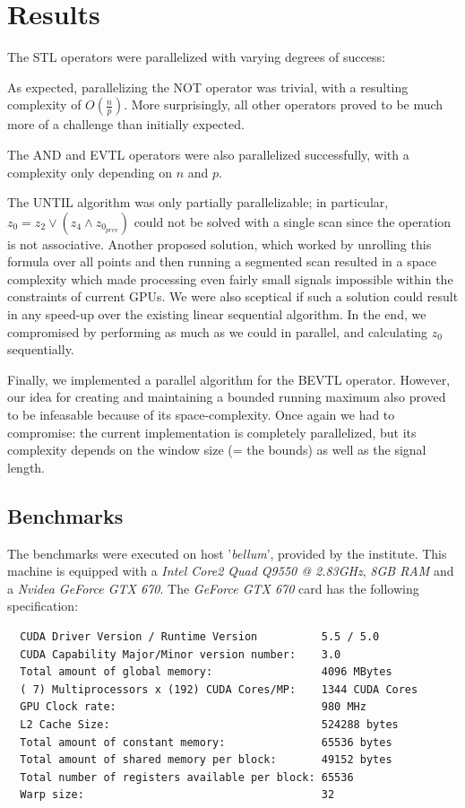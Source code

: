 \documentclass[a4paper,10pt]{article}
\renewcommand{\And}{\wedge}
\newcommand{\Or}{\vee}
\begin{document}

\section{Results}

The STL operators were parallelized with varying degrees of success:

As expected, parallelizing the NOT operator was trivial, with a resulting complexity of $O(\frac{n}{p})$. More surprisingly, all other
operators proved to be much more of a challenge than initially expected.

The AND and EVTL operators were also parallelized successfully, with a complexity only depending on $n$ and $p$.

The UNTIL algorithm was only partially parallelizable; in particular,
$z_0 = z_2 \Or (z_4 \And z_{0_{prev}})$ could not be solved with a single scan since
the operation is not associative. Another proposed solution, which worked by unrolling this formula over all points
and then running a segmented scan resulted in a space complexity which made processing even fairly small signals impossible within the constraints of current GPUs. We were also sceptical if such a solution could result in any speed-up over
the existing linear sequential algorithm. In the end, we compromised by performing
as much as we could in parallel, and calculating $z_0$ sequentially.

Finally, we implemented a parallel algorithm for the BEVTL operator. However,
our idea for creating and maintaining a bounded running maximum also proved to
be infeasable because of its space-complexity. Once again we had to compromise:
the current implementation is completely parallelized, but its complexity depends
on the window size (= the bounds) as well as the signal length.


\subsection{Benchmarks}

The benchmarks were executed on host '{\it bellum}', provided by the institute. This machine is equipped with a {\it Intel Core2 Quad Q9550 @ 2.83GHz}, {\it 8GB RAM} and a {\it Nvidea GeForce GTX 670}. The {\it GeForce GTX 670} card has the following specification:

\begin{lstlisting}
  CUDA Driver Version / Runtime Version          5.5 / 5.0
  CUDA Capability Major/Minor version number:    3.0
  Total amount of global memory:                 4096 MBytes
  ( 7) Multiprocessors x (192) CUDA Cores/MP:    1344 CUDA Cores
  GPU Clock rate:                                980 MHz
  L2 Cache Size:                                 524288 bytes
  Total amount of constant memory:               65536 bytes
  Total amount of shared memory per block:       49152 bytes
  Total number of registers available per block: 65536
  Warp size:                                     32
\end{lstlisting}
\end{document}
